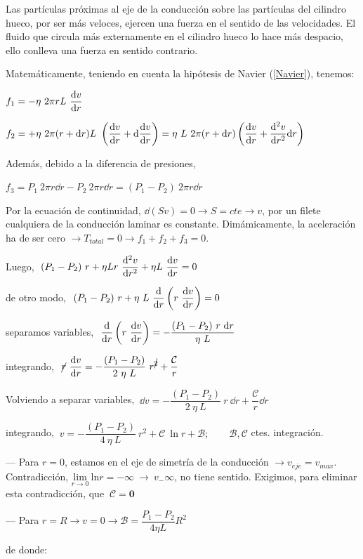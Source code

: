 Las partículas próximas al eje de la conducción sobre las partículas del cilindro hueco, por ser más veloces, ejercen una fuerza en el sentido de las velocidades. El fluido que circula más externamente en el cilindro hueco lo hace más despacio, ello conlleva una fuerza en sentido contrario. 

Matemáticamente, teniendo en cuenta la hipótesis de Navier (\ref{Navier}), tenemos:

$\displaystyle f_1=-\eta \ 2\pi r L \ \dv{v}{r}$

$\displaystyle f_2=+\eta \ 2\pi(r+\dd r)L \ \left( \dv{v}{r} + \dd \dv{v}{r} \right) = \eta \ L\ 2\pi (r+\dd r) \left( \dv{v}{r} +  \dv[2]{v}{r} \dd r \right)$

Además, debido a la diferencia de presiones,

$f_3=P_1\ 2\pi r \dd r -P_2\ 2\pi r \dd r= (P_1-P_2) \ 2 \pi r \dd r$

Por la ecuación de continuidad, $\dd (Sv)=0 \to S=cte \to v$, por un filete cualquiera de la conducción laminar es constante. Dimámicamente, la aceleración ha de ser cero $\to T_{total}=0 \to f_1+f_2+f_3=0$.

Luego, $\displaystyle \ (P_1-P_2)\ r + \eta L r \ \dv[2]{v}{r}+ \eta L \ \dv{v}{r}=0$

de otro modo, $\ \displaystyle (P_1-P_2) \ r + \eta \ L \ \dv{r} \left( r\ \dv{v}{r} \right) = 0$

separamos variables, $\ \displaystyle \dv{r} \left( r\ \dv{v}{r} \right) =-\dfrac{(P_1-P_2) \ r \ \dd r}{\eta \ L}$

integrando, $\ \displaystyle \cancel{r}\ \dv{v}{r} = -\dfrac{(P_1-P_2) }{2\ \eta \ L} \ r^{\cancel{2}} + \dfrac{\mathcal C}{r}$

Volviendo a separar variables, $\displaystyle \ \dd v = -\dfrac{(P_1-P_2) }{2\ \eta \ L} \ r \  \dd r  + \dfrac{\mathcal C}{r} \dd r$

integrando, $\displaystyle \ v=- \dfrac{(P_1-P_2) }{4\ \eta \ L} \ r^2 + \mathcal C \ \ln{r} + \mathcal B;\qquad \mathcal B, \mathcal C$ ctes. integración.

--- Para $r=0$, estamos en el eje de simetría de la conducción $\to v_{eje}=v_{max}$. Contradicción, $ \underset {r\to 0} {\mathrm{lim}}\ \mathrm{ln} r=-\infty \ \to \ v_-\infty$, no tiene sentido. Exigimos, para eliminar esta contradicción, que $\ \boldsymbol{\mathcal C=0}$

--- Para $r=R \to v=0 \to \mathcal B=\dfrac{P_1-P_2}{4\eta L}R^2$

de donde:

